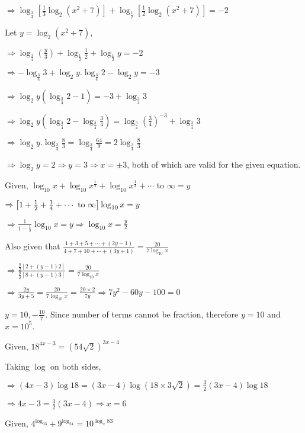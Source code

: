   $\Rightarrow \log_{\tfrac{3}{4}}\left[\frac{1}{3}\log_2(x^2 + 7)\right] + \log_{\tfrac{1}{2}}\left[\frac{1}{2}\log_2(x^2 + 7)\right] = -2$

  Let $y = \log_2(x^2 + 7)$,

  $\Rightarrow \log_{\tfrac{3}{4}}\left(\frac{y}{3}\right) + \log_{\tfrac{1}{2}}\tfrac{1}{2} + \log_{\tfrac{1}{2}}y = -2$

  $\Rightarrow -\log_{\tfrac{3}{4}}3 + \log_2y.\log_{\tfrac{3}{4}}2 - \log_2y = -3$

  $\Rightarrow \log_2y\left(\log_{\tfrac{3}{4}}2 - 1\right) = -3 + \log_{\tfrac{3}{4}}3$

  $\Rightarrow \log_2y\left(\log_{\tfrac{3}{4}}2 - \log_{\tfrac{3}{4}}\tfrac{3}{4}\right) = \log_{\tfrac{3}{4}}\left(\tfrac{3}{4}\right)^{-3} + \log_{\tfrac{3}{4}}3$

  $\Rightarrow \log_2y.\log_{\tfrac{3}{4}}\tfrac{8}{3} = \log_{\tfrac{3}{4}}\tfrac{64}{9} = 2\log_{\tfrac{3}{4}}\tfrac{8}{3}$

  $\Rightarrow \log_2y = 2 \Rightarrow y = 3 \Rightarrow x = \pm3$, both of which are valid for the given equation.
\item Given, $\log_{10}x + \log_{10}x^{\tfrac{1}{2}} + \log_{10}x^{\tfrac{1}{4}} + \cdots$ to $\infty = y$

  $\Rightarrow \left[1 + \frac{1}{2} + \frac{1}{4} + \cdots~{\rm to~}\infty\right]\log_{10}x = y$

  $\Rightarrow \frac{1}{1 - \frac{1}{2}}\log_{10}x = y \Rightarrow \log_{10}x = \frac{y}{2}$

  Also given that $\frac{1 + 3 + 5 + \cdots + (2y - 1)}{4 + 7 + 10 + \cdots + (3y + 1)} = \frac{20}{7\log_{10}x}$

  $\Rightarrow \frac{\frac{y}{2}[2 + (y - 1)2]}{\frac{y}{2}[8 + (y - 1)3]} = \frac{20}{7\log_{10}x}$

  $\Rightarrow \frac{2y}{3y + 5} = \frac{20}{7\log_{10}x} = \frac{20\times2}{7y} \Rightarrow 7y^2 - 60y - 100 = 0$

  $y = 10, -\frac{10}{7}$. Since number of terms cannot be fraction, therefore $y = 10$ and $x = 10^5$.
\item Given, $18^{4x - 3} = (54\sqrt{2})^{3x - 4}$

  Taking $\log$ on both sides,

  $\Rightarrow (4x - 3)\log18 = (3x - 4)\log(18\times3\sqrt{2}) = \frac{3}{2}(3x -4)\log18$

  $\Rightarrow 4x - 3 = \frac{3}{2}(3x - 4) \Rightarrow x = 6$
\item Given, $4^{\log_93} + 9^{\log_24} = 10^{\log_x83}$

